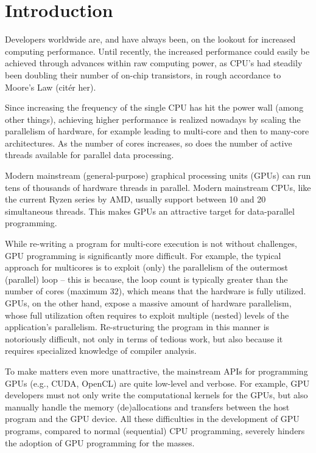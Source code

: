 \chapter{Introduction}

Developers worldwide are, and have always been, on the lookout 
for increased computing performance.
Until recently, the increased performance could easily be
achieved through advances within raw computing power, as CPU's had steadily been
doubling their number of on-chip transistors, in rough accordance to Moore's Law (citér
her).

Since increasing the frequency of the single CPU has hit the power
wall\cite{Dubois:ParCompDesign} (among other things), achieving higher performance 
is realized nowadays by scaling the parallelism of hardware, for example
leading to multi-core and then to many-core architectures.
As the number of cores increases, so does the number of
active threads available for parallel data processing.

Modern mainstream (general-purpose) graphical processing units (GPUs) can run 
tens of thousands of hardware threads in parallel. Modern mainstream CPUs, 
like the current Ryzen series by AMD, usually support between 10 and 20 
simultaneous threads. This makes GPUs an attractive target for data-parallel 
programming.

While re-writing a program for multi-core execution is not without challenges,
GPU programming is significantly more difficult. For example, the typical
approach for multicores is to exploit (only) the parallelism of the outermost
(parallel) loop -- this is because, the loop count is typically greater than 
the number of cores (maximum $32$), which means that the hardware
is fully utilized. GPUs, on the other hand, expose a massive amount of hardware
parallelism, whose full utilization often requires to exploit multiple (nested)
levels of the application's parallelism. Re-structuring the program in this
manner is notoriously difficult, not only in terms of tedious work, but also
because it requires specialized knowledge of compiler analysis.

To make matters even more unattractive, the mainstream APIs for programming
GPUs (e.g., CUDA, OpenCL) are quite low-level and verbose.  For example, GPU
developers must not only write the computational kernels for the GPUs, but 
also manually handle the memory (de)allocations and transfers between the host 
program and the GPU device.  All these difficulties in the development of GPU 
programs, compared to normal (sequential) CPU programming, severely hinders 
the adoption of GPU programming for the masses.

